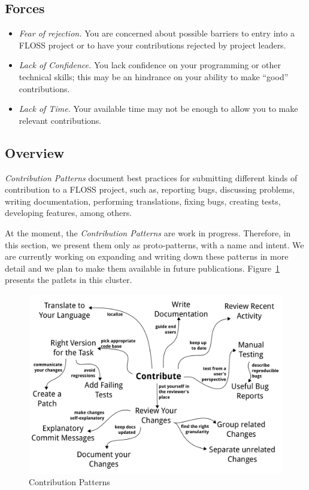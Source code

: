 \documentclass[12pt]{article}
\begin{document}
\subsection{Forces}
\begin{itemize}
\item \textit{Fear of rejection.} You are concerned about possible barriers to entry into a FLOSS project or to have your contributions rejected by project leaders.
\item \textit{Lack of Confidence.} You lack confidence on your programming or other technical skills; 
this may be an hindrance on your ability to  make ``good'' contributions.
\item \textit{Lack of Time.} Your available time may not be enough to allow you to make relevant contributions.
\end{itemize}

\subsection{Overview}

\textit{Contribution Patterns} document best practices for submitting different
kinds of contribution to a FLOSS project, such as, reporting bugs, discussing problems, writing documentation, 
performing translations, fixing bugs, creating tests, developing features, among others.

At the moment, the \textit{Contribution Patterns} are work in progress.
Therefore, in this section, we present them only as proto-patterns, with a name and intent. 
We are currently working on expanding and  writing down these patterns in more detail 
and we plan to make them available in future publications.
Figure~\ref{fig:contribution} presents the patlets in this cluster.

\begin{figure}[hbt]
  \begin{center}
    \includegraphics[width=\textwidth]{figures/contribution}
  \end{center}
  \caption{Contribution Patterns}
  \label{fig:contribution}
\end{figure}
\end{document}
